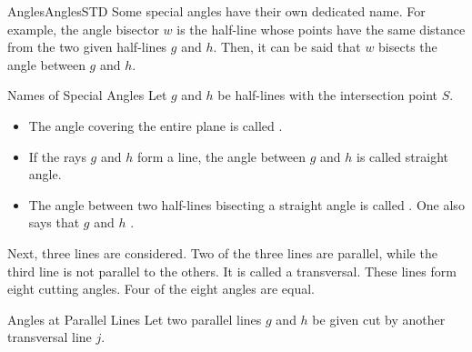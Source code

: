 \begin{MXContent}{Angles}{Angles}{STD}
Some special angles have their own dedicated name. For example, the angle bisector $w$
is the half-line whose points have the same distance from the two given half-lines $g$ 
and $h$. Then, it can be said that $w$ bisects the angle between $g$ and $h$.

\begin{MXInfo}{Names of Special Angles}
Let $g$ and $h$ be half-lines with the intersection point $S$.

\begin{itemize}
\item
The angle covering the entire plane is called .

\item
If the rays $g$ and $h$ form a line, the angle between $g$ and $h$ is called
straight angle.
\item
The angle between two half-lines bisecting a straight angle is called 
 . 
One also says that $g$ and $h$ .
\end{itemize}
\end{MXInfo}

Next, three lines are considered. Two of the three lines are parallel, while the 
third line is not parallel to the others. It is called a transversal. These lines form
eight cutting angles. Four of the eight angles are equal.

\begin{MXInfo}{Angles at Parallel Lines}%
%
Let two parallel lines $g$ and $h$  be given cut by another transversal line $j$.



\end{MXInfo}
\end{MXContent}
